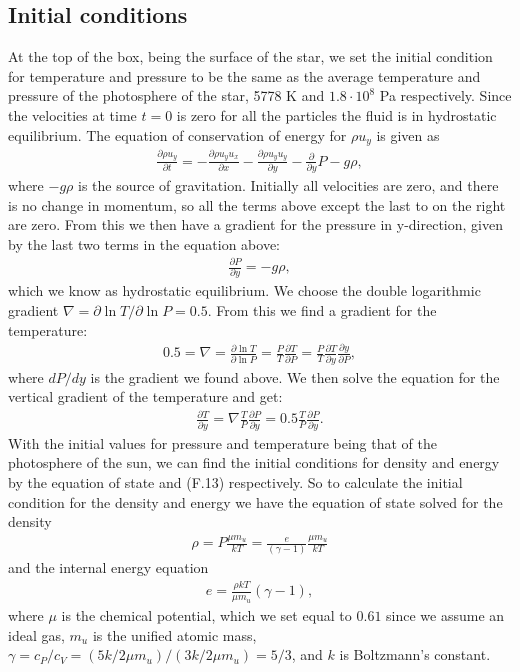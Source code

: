\documentclass[a4paper,10pt]{article}
\begin{document}
\subsection{Initial conditions}
At the top of the box, being the surface of the star, we set the initial condition for temperature and pressure to be the same as the average temperature and pressure of the photosphere of the star, 5778 K and $1.8 \cdot 10^8$ Pa respectively. Since the velocities at time $t = 0$ is zero for all the particles the fluid is in hydrostatic equilibrium. The equation of conservation of energy for $\rho u_y$ is given as
%
\begin{align}\label{eq:dpuy_dt}
\frac{\partial \rho u_y}{\partial t} = -\frac{\partial \rho u_y u_x}{\partial x} - \frac{\partial \rho u_y u_y}{\partial y} - \frac{\partial}{\partial y} P - g\rho,
\end{align}
%
where $-g\rho$ is the source of gravitation. Initially all velocities are zero, and there is no change in momentum, so all the terms above except the last to on the right are zero. From this we then have a gradient for the pressure in y-direction, given by the last two terms in the equation above:
\begin{align}\label{eq:dP_dy}
\frac{\partial P}{\partial y} = -g\rho,
\end{align}
%
which we know as hydrostatic equilibrium. We choose the double logarithmic gradient $\nabla = \partial \ln T/\partial \ln P = 0.5$. From this we find a gradient for the temperature:
%
\begin{align*}
0.5 = \nabla = \frac{\partial \ln T}{\partial \ln P} = \frac{P}{T}\frac{\partial T}{\partial P} = \frac{P}{T}\frac{\partial T}{\partial y}\frac{\partial y}{\partial P},
\end{align*}
%
where $dP/dy$ is the gradient we found above. We then solve the equation for the vertical gradient of the temperature and get:
%
\begin{align}\label{eq:dT_dy}
\frac{\partial T}{\partial y} = \nabla \frac{T}{P}\frac{\partial P}{\partial y} = 0.5\frac{T}{P}\frac{\partial P}{\partial y}.
\end{align}
With the initial values for pressure and temperature being that of the photosphere of the sun, we can find the initial conditions for density and energy by the equation of state and (F.13) respectively. So to calculate the initial condition for the density and energy we have the equation of state solved for the density
%
\begin{align}\label{eq:eos}
\rho = P\frac{\mu m_u  }{kT} = \frac{e}{(\gamma - 1)}\frac{\mu m_u}{kT}
\end{align}
%
and the internal energy equation
%
\begin{align}
e = \frac{\rho k T}{\mu m_u}(\gamma - 1),
\end{align}
 where $\mu$ is the chemical potential, which we set equal to $0.61$ since we assume an ideal gas, $m_u$ is the unified atomic mass, $\gamma = c_P/c_V = (5k/2\mu m_u)/(3k/2\mu m_u) = 5/3$, and $k$ is Boltzmann's constant. 
\end{document}
